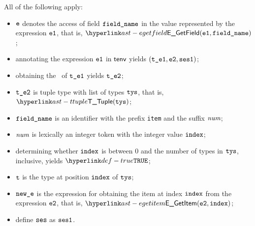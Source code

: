 \ProseParagraph
All of the following apply:
\begin{itemize}
  \item $\ve$ denotes the access of field $\fieldname$ in the value represented by the expression $\veone$, that is, $\EGetField(\veone, \fieldname)$;
  \item annotating the expression $\veone$ in $\tenv$ yields $(\vteone, \vetwo, \vsesone)$\ProseOrTypeError;
  \item obtaining the \underlyingtype\ of $\vteone$ yields $\vtetwo$\ProseOrTypeError;
  \item $\vtetwo$ is tuple type with list of types $\tys$, that is, $\TTuple(\tys)$;
  \item $\fieldname$ is an identifier with the prefix \texttt{item} and the suffix $\num$;
  \item $\num$ is lexically an integer token with the integer value $\vindex$;
  \item determining whether $\vindex$ is between $0$ and the number of types in $\tys$, inclusive, yields $\True$\ProseOrTypeError;
  \item $\vt$ is the type at position $\vindex$ of $\tys$;
  \item $\newe$ is the expression for obtaining the item at index $\vindex$ from the expression $\vetwo$, that is, $\EGetItem(\vetwo, \vindex)$;
  \item define $\vses$ as $\vsesone$.
\end{itemize}
\FormallyParagraph
\begin{mathpar}
\end{mathpar}

